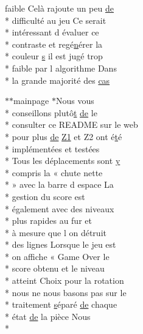 \begin{DoxyCompactItemize}
faible Celà rajoute un peu \hyperlink{mainpage_8dox_ab37fa35e77d95c6d0d0ab620c97c3db8}{de} \\*
difficulté au jeu Ce serait \\*
intéressant d évaluer ce \\*
contraste et regé\hyperlink{glext_8h_a0788d3762d0c3c76e4c094d8078b4c27}{n}érer la \\*
couleur \hyperlink{gl_8h_ad585a1393cfa368fa9dc3d8ebff640d5}{s} il est jugé trop \\*
faible par l algorithme Dans \\*
la grande majorité des \hyperlink{mainpage_8dox_a28d908e91a20ecb016d27b941f85907c}{cas}
\item 
$\ast$$\ast$mainpage $\ast$Nous vous \\*
conseillons plutô\hyperlink{gl_8h_a00140d6f5c548b26daf170bf16e86a6d}{t} \hyperlink{mainpage_8dox_ab37fa35e77d95c6d0d0ab620c97c3db8}{de} le \\*
consulter ce R\-E\-A\-D\-M\-E sur le web \\*
pour plus \hyperlink{mainpage_8dox_ab37fa35e77d95c6d0d0ab620c97c3db8}{de} \hyperlink{mainpage_8dox_ac1b4262bdb6c0693bc375775d6cfa421}{Z1} et Z2 ont é\hyperlink{gl_8h_a00140d6f5c548b26daf170bf16e86a6d}{t}é \\*
implémentées et testées \\*
Tous les déplacements sont \hyperlink{gl_8h_a74d80fd479c0f6d0153c709949a089ef}{y} \\*
compris la « chute nette \\*
» avec la barre d espace La \\*
gestion du score est \\*
également avec des niveaux \\*
plus rapides au fur et \\*
à mesure que l on détruit \\*
des lignes Lorsque le jeu est \\*
on affiche « Game Over le \\*
score obtenu et le niveau \\*
atteint Choix pour la rotation \\*
nous ne nous basons pas sur le \\*
traitement \hyperlink{gl_8h_ad585a1393cfa368fa9dc3d8ebff640d5}{s}éparé \hyperlink{mainpage_8dox_ab37fa35e77d95c6d0d0ab620c97c3db8}{de} chaque \\*
état \hyperlink{mainpage_8dox_ab37fa35e77d95c6d0d0ab620c97c3db8}{de} la pièce Nous \\*
$$
\end{DoxyCompactItemize}
